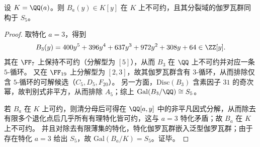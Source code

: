 \begin{conclusion}[分歧五次多项式的泛型最大对称性：\texorpdfstring{$\mathrm{Gal}(B_a/\QQ(a))\cong S_5$}{Gal(Ba/Q(a))=S5}]\label{con:xi-terminal-zm-leyang-spectral-quartic-a-branch-quintic-s5}
设 \(K=\QQ(a)\)。则 \(B_a(y)\in K[y]\) 在 \(K\) 上不可约，且其分裂域的伽罗瓦群同构于 \(S_5\)。
\end{conclusion}
\begin{proof}
取特化 \(a=3\)，得到
\[
B_3(y)=400y^5+396y^4+637y^3+972y^2+308y+64\in\ZZ[y].
\]
其在 \(\FF_7\) 上保持不可约（分解型为 \([5]\)），从而 \(B_3\) 在 \(\QQ\) 上不可约并对应一条 \(5\)-循环。
又在 \(\FF_{19}\) 上分解型为 \([2,3]\)，故其伽罗瓦群含有 \(3\)-循环，从而排除仅含 \(5\)-循环的可解候选（\(C_5,D_5,F_{20}\)）。
另一方面，\(\mathrm{Disc}(B_3)\) 含素因子 \(31\) 的奇次幂，故判别式非平方，从而排除 \(A_5\)；综上
\(
\mathrm{Gal}(B_3/\QQ)\cong S_5
\)。
\par
若 \(B_a\) 在 \(K\) 上可约，则清分母后可得在 \(\QQ[a,y]\) 中的非平凡因式分解，从而除去有限多个退化点后几乎所有有理特化皆可约，这与 \(a=3\) 特化矛盾；故 \(B_a\) 在 \(K\) 上不可约。
并且对除去有限薄集的特化，特化伽罗瓦群嵌入泛型伽罗瓦群；由于存在特化 \(a=3\) 给出 \(S_5\)，故 \(\mathrm{Gal}(B_a/K)=S_5\)。证毕。
\end{proof}

